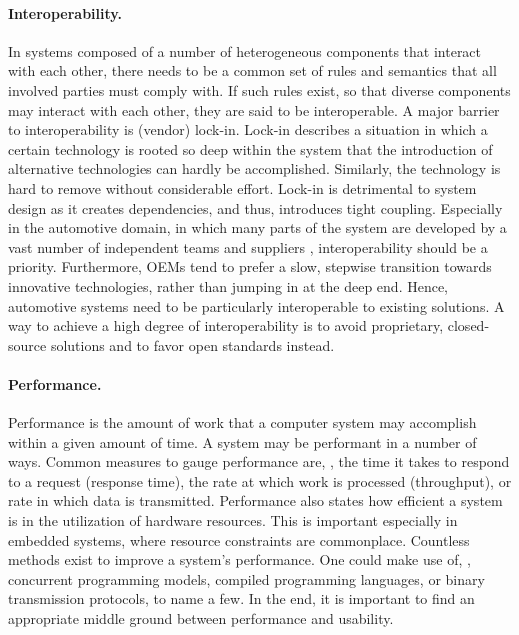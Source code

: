 \paragraph{Interoperability.}
In systems composed of a number of heterogeneous components that interact with each other, there needs to be a common set of rules and semantics that all involved parties must comply with. If such rules exist, so that diverse components may interact with each other, they are said to be interoperable.
A major barrier to interoperability is (vendor) lock-in. Lock-in describes a situation in which a certain technology is rooted so deep within the system that the introduction of alternative technologies can hardly be accomplished. Similarly, the technology is hard to remove without considerable effort. Lock-in is detrimental to system design as it creates dependencies, and thus, introduces tight coupling. Especially in the automotive domain, in which many parts of the system are developed by a vast number of independent teams and suppliers \cite{broy2006challenges}, interoperability should be a priority. Furthermore, OEMs tend to prefer a slow, stepwise transition towards innovative technologies, rather than jumping in at the deep end. Hence, automotive systems need to be particularly interoperable to existing solutions. A way to achieve a high degree of interoperability is to avoid proprietary, closed-source solutions and to favor open standards instead.

\paragraph{Performance.}
Performance is the amount of work that a computer system may accomplish within a given amount of time. A system may be performant in a number of ways. Common measures to gauge performance are, \eg , the time it takes to respond to a request (response time), the rate at which work is processed (throughput), or rate in which data is transmitted. Performance also states how efficient a system is in the utilization of hardware resources. This is important especially in embedded systems, where resource constraints are commonplace. Countless methods exist to improve a system's performance. One could make use of, \eg , concurrent programming models, compiled programming languages, or binary transmission protocols, to name a few. In the end, it is important to find an appropriate middle ground between performance and usability.

